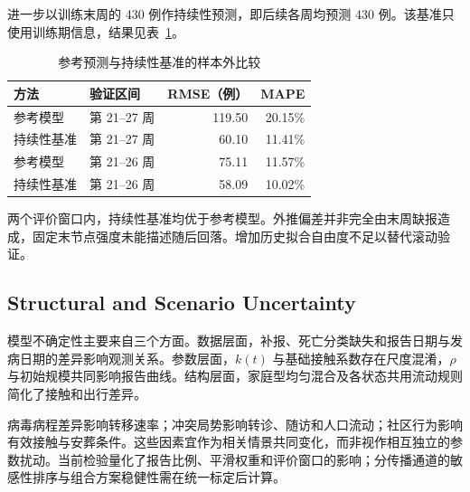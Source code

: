 进一步以训练末周的 430 例作持续性预测，即后续各周均预测 430 例。该基准只使用训练期信息，结果见表~\ref{tab:forecast-baseline}。

\begin{table}[!htbp]
\centering
\caption{参考预测与持续性基准的样本外比较}
\label{tab:forecast-baseline}
\begin{tabular}{@{}llrr@{}}
\toprule
方法 & 验证区间 & RMSE（例） & MAPE \\
\midrule
参考模型 & 第 21--27 周 & 119.50 & 20.15\% \\
持续性基准 & 第 21--27 周 & 60.10 & 11.41\% \\
参考模型 & 第 21--26 周 & 75.11 & 11.57\% \\
持续性基准 & 第 21--26 周 & 58.09 & 10.02\% \\
\bottomrule
\end{tabular}
\end{table}

两个评价窗口内，持续性基准均优于参考模型。外推偏差并非完全由末周缺报造成，固定末节点强度未能描述随后回落。增加历史拟合自由度不足以替代滚动验证。

\subsection{Structural and Scenario Uncertainty}

模型不确定性主要来自三个方面。数据层面，补报、死亡分类缺失和报告日期与发病日期的差异影响观测关系。参数层面，$k(t)$ 与基础接触系数存在尺度混淆，$\rho$ 与初始规模共同影响报告曲线。结构层面，家庭型均匀混合及各状态共用流动规则简化了接触和出行差异。

病毒病程差异影响转移速率；冲突局势影响转诊、随访和人口流动；社区行为影响有效接触与安葬条件。这些因素宜作为相关情景共同变化，而非视作相互独立的参数扰动。当前检验量化了报告比例、平滑权重和评价窗口的影响；分传播通道的敏感性排序与组合方案稳健性需在统一标定后计算。
